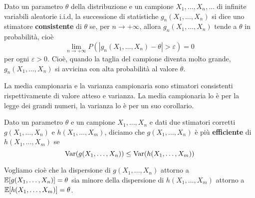 \begin{definition}\label{def: stimatore consistente}
	Dato un parametro $\theta$ della distribuzione e un campione $X_1, \dots, X_n, \dots$ di
	infinite variabili aleatorie i.i.d, la successione di statistiche $g_n(X_1, \dots, X_n)$ si
	dice uno stimatore \textbf{consistente} di $\theta$ se, per $n \to +\infty$, allora
	$g_n(X_1, \dots, X_n)$ tende a $\theta$ in probabilità, cioè
	\[ \lim_{n \to +\infty} P(|g_n(X_1, \dots, X_n) - \theta| > \varepsilon) = 0 \]
	per ogni $\varepsilon > 0$. Cioè, quando la taglia del campione diventa molto grande,
	$g_n(X_1, \dots, X_n)$ si avvicina con alta probabilità al valore $\theta$.
\end{definition}

La media campionaria e la varianza campionaria sono stimatori consistenti rispettivamente di valore
atteso e varianza. La media campionaria lo è per la legge dei grandi numeri, la varianza lo è per
un suo corollario.

\begin{definition}\label{def: stimatore efficiente}
	Dato un parametro $\theta$ e un campione $X_1, \dots, X_n$ e dati due stimatori corretti
	$g(X_1, \dots, X_n)$ e $h(X_1, \dots, X_m)$, diciamo che $g(X_1, \dots, X_n)$ è più
	\textbf{efficiente} di $h(X_1, \dots, X_m)$ se
	\[ \operatorname{Var}(g(X_1, \dots, X_n)) \leq \operatorname{Var}(h(X_1, \dots, X_m)) \]
\end{definition}

Vogliamo cioè che la dispersione di $g(X_1, \dots, X_n)$ attorno a
$\mathbb{E}[g(X_1, \dots, X_n)] = \theta$ sia minore della dispersione di $h(X_1, \dots, X_m)$ attorno a
$\mathbb{E}[h(X_1, \dots, X_m)] = \theta$.